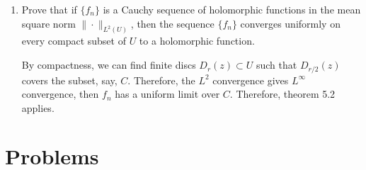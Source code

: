 \documentclass[11pt]{report}
\theoremstyle{mythm}
\let\oldendproof\endproof
\renewenvironment{proof}[1][\proofname]{%
  \oldproof[\normalfont \bfseries #1]%
}{\oldendproof}
\renewcommand*{\proofname}{Proof}
\theoremstyle{myans}
\newcommand{\norm}[1]{\|#1\|}
\begin{document}
\begin{enumerate}
\begin{enumerate}
    \item Prove that if $\{f_n\}$ is a Cauchy sequence of holomorphic functions in the mean square
    norm $\norm{\cdot}_{L^2(U)}$, then the sequence $\{f_n\}$ converges uniformly on every compact
    subset of $U$ to a holomorphic function.
    \begin{proof}
      By compactness, we can find finite discs $D_{r}(z) \subset U$ such that
      $D_{r/2}(z)$ covers the subset, say, $C$. Therefore, the $L^2$ convergence gives $L^\infty$
      convergence, then $f_n$ has a uniform limit over $C$. Therefore, theorem 5.2 applies.
    \end{proof}
  \end{enumerate}
\end{enumerate}

\section{Problems}
\end{document}
